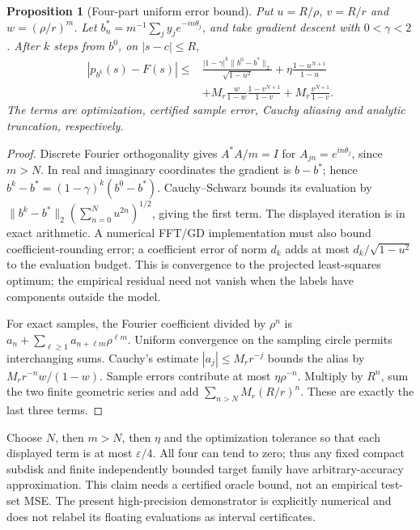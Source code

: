 \documentclass[11pt,oneside,openany]{book}
\newtheorem{proposition}[theorem]{Proposition}
\theoremstyle{definition}\newtheorem{definition}[theorem]{Definition}
\theoremstyle{remark}\newtheorem{remark}[theorem]{Remark}
\begin{document}
\begin{proposition}[Four-part uniform error bound]\label{hl:finite}
Put $u=R/\rho$, $v=R/r$ and $w=(\rho/r)^m$. Let
$b_n^*=m^{-1}\sum_jy_je^{-in\theta_j}$, and take gradient descent with
$0<\gamma<2$. After $k$ steps from $b^0$, on $|s-c|\le R$,
\[
 \begin{split}
 |p_{b^k}(s)-F(s)|\le{}&
 \frac{|1-\gamma|^k\|b^0-b^*\|_2}{\sqrt{1-u^2}}
 +\eta\frac{1-u^{N+1}}{1-u}\\
 &+M_r\frac{w}{1-w}\frac{1-v^{N+1}}{1-v}
 +M_r\frac{v^{N+1}}{1-v}.
 \end{split}
\]
The terms are optimization, certified sample error, Cauchy aliasing and
analytic truncation, respectively.
\end{proposition}
\begin{proof}
Discrete Fourier orthogonality gives $A^*A/m=I$ for
$A_{jn}=e^{in\theta_j}$, since $m>N$. In real and imaginary coordinates the
gradient is $b-b^*$; hence
$b^k-b^*=(1-\gamma)^k(b^0-b^*)$. Cauchy--Schwarz bounds its evaluation by
$\|b^k-b^*\|_2(\sum_{n=0}^Nu^{2n})^{1/2}$, giving the first term.
The displayed iteration is in exact arithmetic. A numerical FFT/GD implementation
must also bound coefficient-rounding error; a coefficient error of norm $d_k$
adds at most $d_k/\sqrt{1-u^2}$ to the evaluation budget.
This is convergence to the projected least-squares optimum; the empirical
residual need not vanish when the labels have components outside the model.

For exact samples, the Fourier coefficient divided by $\rho^n$ is
$a_n+\sum_{\ell\ge1}a_{n+\ell m}\rho^{\ell m}$.
Uniform convergence on the sampling circle permits interchanging sums.
Cauchy's estimate $|a_j|\le M_rr^{-j}$ bounds the alias by
$M_rr^{-n}w/(1-w)$. Sample errors contribute at most $\eta\rho^{-n}$.
Multiply by $R^n$, sum the two finite geometric series and add
$\sum_{n>N}M_r(R/r)^n$. These are exactly the last three terms.
\end{proof}

Choose $N$, then $m>N$, then $\eta$ and the optimization tolerance so that
each displayed term is at most $\varepsilon/4$. All four can tend to zero;
thus any fixed compact subdisk and finite independently bounded target family
have arbitrary-accuracy approximation. This claim needs a certified oracle
bound, not an empirical test-set MSE. The present high-precision demonstrator
is explicitly numerical and does not relabel its floating evaluations as
interval certificates.
\end{document}
